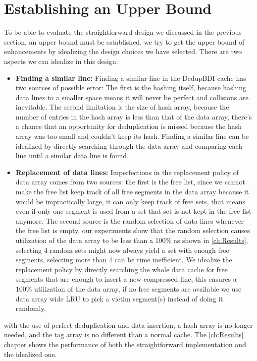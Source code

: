 \section{Establishing an Upper Bound}
\label{sec:Upper Bound}
To be able to evaluate the straightforward design we discussed in the previous section, an upper bound must be established, we try to get the upper bound of enhancements by idealizing the design choices we have selected. There are two aspects we can idealize in this design:
\begin{itemize}
    \item \textbf{Finding a similar line:} Finding a similar line in the DedupBDI cache has two sources of possible error: The first is the hashing itself, because hashing data lines to a smaller space means it will never be perfect and collisions are inevitable. The second limitation is the size of hash array, because the number of entries in the hash array is less than that of the data array, there's a chance that an opportunity for deduplication is missed because the hash array was too small and couldn't keep its hash. Finding a similar line can be idealized by directly searching through the data array and comparing each line until a similar data line is found.
    \item \textbf{Replacement of data lines:} Imperfections in the replacement policy of data array comes from two sources: the first is the free list, since we cannot make the free list keep track of all free segments in the data array because it would be impractically large, it can only keep track of free sets, that means even if only one segment is used from a set that set is not kept in the free list anymore. The second source is the random selection of data lines whenever the free list is empty, our experiments show that the random selection causes utilization of the data array to be less than a 100\% as shown in \ref{ch:Results}, selecting 4 random sets might now always yield a set with enough free segments, selecting more than 4 can be time inefficient. We idealize the replacement policy by directly searching the whole data cache for free segments that are enough to insert a new compressed line, this ensures a 100\% utilization of the data array, if no free segments are available we use data array wide LRU to pick a victim segment(s) instead of doing it randomly.
\end{itemize}
with the use of perfect deduplication and data insertion, a hash array is no longer needed, and the tag array is no different than a normal cache. The \ref{ch:Results} chapter shows the performance of both the straightforward implementation and the idealized one.



